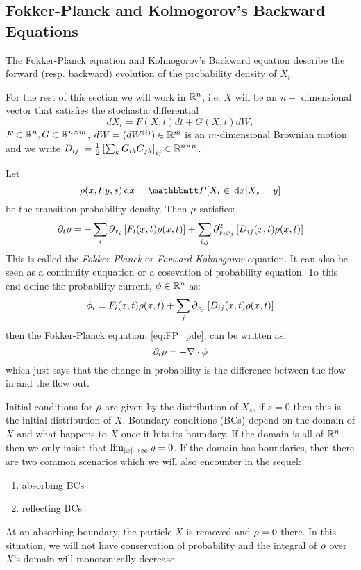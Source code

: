 \subsection{Fokker-Planck and Kolmogorov's Backward Equations}
The Fokker-Planck equation and Kolmogorov's Backward equation describe the
forward (resp. backward)  evolution of the probability density of $X_t$

For the rest of this section we will work in $ { \mathbb{R} }^n$, i.e. $X$ will be an $n-$
dimensional vector that satisfies the stochastic differential 
\begin{equation}
dX_t = F(X,t) dt + G(X,t) dW,
\label{eq:generic_Ito_SDE_Rn}
\end{equation}
$F \in { \mathbb{R} }^n, G \in { \mathbb{R} }^{n \times m}$,
$dW = (dW^{(i)}) \in  { \mathbb{R} }^{  m}$ is an $m$-dimensional Brownian motion and we
write $D_{ij} :=
\tfrac{1}{2} 
\left[{\sum_k G_{ik} G_{jk} } \right]_{ij} \in { \mathbb{R} }^{n\times n} $.

Let 
\begin{equation}
 \f(x,t| y,s) \intd{x} =  \Prob[X_t \in \intd{x} | X_s = y]
 \label{eq:transition_prob_defn} 
 \end{equation}
be the transition probability density. Then ${\rho}$ satisfies:
\begin{equation}
{\partial}_t {\rho}= -\sum_i {\partial}_{x_i} \left[ F_i(x,t) {\rho}(x,t) \right] 
+ 
\sum_{i,j}  {\partial}^2_{x_i x_j} \left[ D_{ij}(x,t) {\rho}(x,t) \right]
\label{eq:FP_pde}
\end{equation}
This is called the \emph{Fokker-Planck} or \emph{Forward Kolmogorov} equation.
It can also be seen as a continuity euquation or a cosevation of probability
equation. To this end define the probability current, ${ \phi } \in { \mathbb{R} }^n$ as:
$$
\phi_i =   F_i(x,t) {\rho}(x,t) 
+ 
\sum_{j}  {\partial}_{x_j} \left[ D_{ij}(x,t) {\rho}(x,t)\right]
$$
then the Fokker-Planck equation, \cref{eq:FP_pde}, can be written as:
$$
{\partial}_t {\rho}= -{ \nabla } \cdot \phi
$$
which just says that the change in probability is the
difference between the flow in and the flow out. 

Initial conditions for ${\rho}$ are given by the distribution of $X_s$, if $s=0$
then this is the initial distribution of $X$. Boundary conditions (BCs) depend
on the domain of $X$ and what happens to $X$ once it hits its boundary. If the domain
is all of ${ \mathbb{R} }^n$ then we only insist that $\lim_{|x| {\rightarrow} \infty} {\rho} = 0$. If the
domain has boundaries, then there are two common scenarios which we will also
encounter in the sequel:
\begin{enumerate}  
  \item absorbing BCs
  \item reflecting BCs
\end{enumerate}
At an absorbing boundary, the particle $X$ is removed and ${\rho}=0$ there.
In this situation, we will not have conservation of probability and the integral
of ${\rho}$ over $X$'s domain will monotonically decrease.

